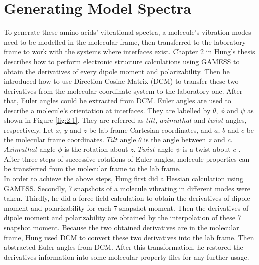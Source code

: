 \section{Generating Model Spectra}
To generate these amino acids' vibrational spectra, a molecule's vibration modes need to be modelled in the molecular frame, then transferred to the laboratory frame to work with the systems where interfaces exist. Chapter 2 in Hung's thesis \cite{KuoKaiHung:Thesis:2015} describes how to perform electronic structure calculations using GAMESS \cite{GAMESS} to obtain the derivatives of every dipole moment and polarizability. Then he introduced how to use Direction Cosine Matrix (DCM) to transfer these two derivatives from the molecular coordinate system to the laboratory one. After that, Euler angles could be extracted from DCM. Euler angles are used to describe a molecule's orientation at interfaces. They are labelled by $\theta$, $\phi$ and $\psi$ as shown in Figure \ref{fig:2.1}. They are referred as $tilt$, $azimuthal$ and $twist$ angles, respectively. Let $x$, $y$ and $z$ be lab frame Cartesian coordinates, and $a$, $b$ and $c$ be the molecular frame coordinates. $Tilt$ angle $\theta$ is the angle between $z$ and $c$. $Azimuthal$ angle $\phi$ is the rotation about $z$. $Twist$ angle $\psi$ is a twist about $c$ \cite{hore0033-rotations}. After three steps of successive rotations of Euler angles, molecule properties can be transferred from the molecular frame to the lab frame. \\

In order to achieve the above steps, Hung first did a Hessian calculation using GAMESS. Secondly, 7 snapshots of a molecule vibrating in different modes were taken. Thirdly, he did a force field calculation to obtain the derivatives of dipole moment and polarizability for each 7 snapshot moment. Then the derivatives of dipole moment and polarizability are obtained by the interpolation of these 7 snapshot moment. Because the two obtained derivatives are in the molecular frame, Hung used DCM to convert these two derivatives into the lab frame. Then abstracted Euler angles from DCM. After this transformation, he restored the derivatives information into some molecular property files for any further usage. \\

